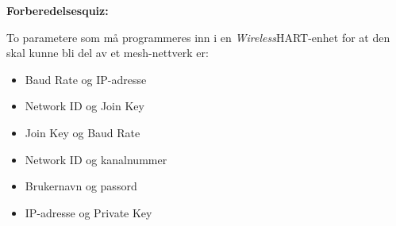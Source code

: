 \noindent
{\bf Forberedelsesquiz:}

To parametere som må programmeres inn i en {\sl Wireless}HART-enhet for at den skal kunne bli del av et mesh-nettverk er:

\begin{itemize}
\item{} Baud Rate og IP-adresse
\vskip 5pt 
\item{} Network ID og Join Key
\vskip 5pt 
\item{} Join Key og Baud Rate
\vskip 5pt 
\item{} Network ID og kanalnummer
\vskip 5pt 
\item{} Brukernavn og passord
\vskip 5pt 
\item{} IP-adresse og Private Key
\end{itemize}






